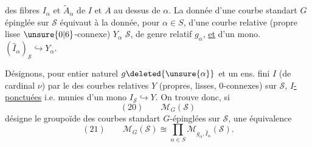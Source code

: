 des fibres $I_\alpha$ et $\widetilde A_\alpha$ de $I$ et $A$ au dessus de $\alpha$. La donnée d'une courbe standart $G$ épinglée sur $\mathcal S$ équivaut à la donnée,  pour  $\alpha\in S$, d'une courbe relative (propre lisse  $\unsure{0|6}$-connexe) $Y_\alpha$  $\mathcal S$, de genre relatif $g_\alpha$, \uline{et} d'un mono. $(\widehat I_\alpha)_{\mathcal S}\hookrightarrow Y_\alpha$.

Désignons,  pour  entier naturel $g\deleted{\unsure{\alpha}}$ et un ens. fini $I$ (de cardinal $\nu$) par
le  des courbes relatives $Y$ (propres, lisses, $0$-connexes) sur $\mathcal S$, \uline{$I$-ponctuées} i.e. munies d'un mono $I_{\mathcal S}\hookrightarrow Y$. On trouve donc, si
\[
(20)\qquad\mathcal M_G(\mathcal S)
\]
désigne le groupoïde des courbes standart $G$-épinglées sur $\mathcal S$, une équivalence
\[
(21)\qquad\mathcal M_G(\mathcal S)\approxeq\prod_{\alpha\in S}\mathcal M_{g_\alpha,\widehat I_\alpha}(\mathcal S).
\]
